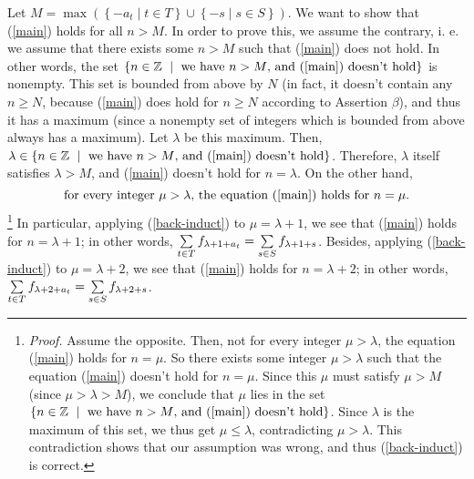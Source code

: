 \documentclass[numbers=enddot,12pt,final,onecolumn,notitlepage]{scrartcl}%
\numberwithin{exer}{section}
\theoremstyle{definition}
\let\sumnonlimits\sum
\renewcommand{\sum}{\sumnonlimits\limits}
\begin{document}
Let $M=\max\left(  \left\{  -a_{t}\mid t\in T\right\}  \cup\left\{  -s\mid
s\in S\right\}  \right)  $. We want to show that (\ref{main}) holds for all
$n>M$. In order to prove this, we assume the contrary, i. e. we assume that
there exists some $n>M$ such that (\ref{main}) does not hold. In other words,
the set $\left\{  n\in\mathbb{Z}\ \mid\ \text{we have }n>M\text{, and
(\ref{main}) doesn't hold}\right\}  $ is nonempty. This set is bounded from
above by $N$ (in fact, it doesn't contain any $n\geq N$, because (\ref{main})
does hold for $n\geq N$ according to Assertion $\beta$), and thus it has a
maximum (since a nonempty set of integers which is bounded from above always
has a maximum). Let $\lambda$ be this maximum. Then, $\lambda\in\left\{
n\in\mathbb{Z}\ \mid\ \text{we have }n>M\text{, and (\ref{main}) doesn't
hold}\right\}  $. Therefore, $\lambda$ itself satisfies $\lambda>M$, and
(\ref{main}) doesn't hold for $n=\lambda$. On the other hand,%
\begin{equation}
\text{for every integer }\mu>\lambda\text{, the equation (\ref{main}) holds
for }n=\mu. \label{back-induct}%
\end{equation}
\footnote{\textit{Proof.} Assume the opposite. Then, not for every integer
$\mu>\lambda$, the equation (\ref{main}) holds for $n=\mu$. So there exists
some integer $\mu>\lambda$ such that the equation (\ref{main}) doesn't hold
for $n=\mu$. Since this $\mu$ must satisfy $\mu>M$ (since $\mu>\lambda>M$), we
conclude that $\mu$ lies in the set $\left\{  n\in\mathbb{Z}\ \mid\ \text{we
have }n>M\text{, and (\ref{main}) doesn't hold}\right\}  $. Since $\lambda$ is
the maximum of this set, we thus get $\mu\leq\lambda$, contradicting
$\mu>\lambda$. This contradiction shows that our assumption was wrong, and
thus (\ref{back-induct}) is correct.} In particular, applying
(\ref{back-induct}) to $\mu=\lambda+1$, we see that (\ref{main}) holds for
$n=\lambda+1$; in other words, $\sum\limits_{t\in T}f_{\lambda+1+a_{t}}%
=\sum\limits_{s\in S}f_{\lambda+1+s}$. Besides, applying (\ref{back-induct})
to $\mu=\lambda+2$, we see that (\ref{main}) holds for $n=\lambda+2$; in other
words, $\sum\limits_{t\in T}f_{\lambda+2+a_{t}}=\sum\limits_{s\in S}%
f_{\lambda+2+s}$.
\end{document}
